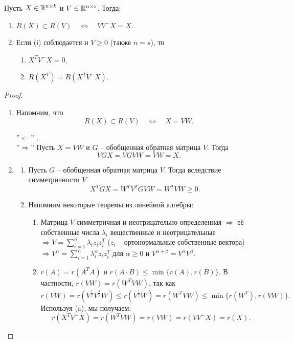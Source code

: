 \begin{lmm} \label{Range inclusion}
	Пусть $X \in \mathbb{R}^{n \times k}$ и $V \in \mathbb{R}^{n \times s}$. Тогда:
	\begin{enumerate}
		\item $R(X) \subset R(V) \quad \Longleftrightarrow \quad VV^-X = X.$
		\item Если (i) соблюдается и $V \geq 0$ (также $n = s$), то
		\begin{enumerate}
			\item $X^T V^-X = 0,$
			\item $R(X^T) = R(X^TV^-X).$
		\end{enumerate}
	\end{enumerate}
\end{lmm}
\begin{proof}
	\begin{enumerate}
		\item Напомним, что
		\[ R(X) \subset R(V) \quad \Longleftrightarrow \quad X = VW. \]
		
		''$\Longleftarrow$'' \checkmark. \\
		''$\Longrightarrow$'' Пусть $X = VW$ и $G$ -- обобщенная обратная матрица $V$. Тогда
		\[ VGX = VGVW = VW = X. \]
		\item
		\begin{enumerate}
			\item Пусть $G$ -- обобщенная обратная матрица $V$. Тогда вследствие симметричности $V$
		    \[ X^TGX = W^TV^TGVW = W^TVW \geq 0. \]
		    \item Напомним некоторые теоремы из линейной алгебры:
		    \begin{enumerate}
		    	\item Матрица $V$ симметричная и неотрицательно определенная $\Longrightarrow$ её собственные числа $\lambda_i$ вещественные и неотрицательные
		    	$\Longrightarrow V = \sum_{i=1}^n \lambda_i z_i z_i^T$ ($z_i$ -- ортонормальные собственные вектора)
		    	$\Longrightarrow V^\alpha = \sum_{i=1}^{n} \lambda_i^\alpha z_i z_i^T$ для $\alpha \geq 0$ и $V^{\alpha + \beta} = V^\alpha V^\beta$.
		    	\item $r(A) = r(A^TA)$ и $r(A \cdot B) \leq \min{\{r(A), r(B)\}}$.
		    	В частности, $r(VW) = r(W^TVW)$, так как
		    	\[ r(VW) = r(V^{\frac{1}{2}}V^{\frac{1}{2}}W) \leq r(V^{\frac{1}{2}}W) = r(W^TVW) \leq \min \{r(W^T), r(VW) \}.   \]
		    	Используя (a), мы получаем:
		    	\[ r(X^TV^-X) = r(W^TVW) = r(VW) = r(VV^-X) = r(X). \]
		    \end{enumerate}
    	\end{enumerate}  
	\end{enumerate}
\end{proof}

